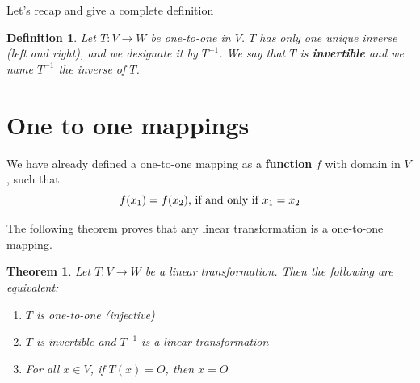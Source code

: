 \documentclass{book}
\newtheorem{theorem}{Theorem}[section]
\newtheorem{definition}{Definition}[section]
\begin{document}
Let's recap and give a complete definition

\begin{definition}
    Let $T:V \to W$ be one-to-one in $V$. $T$ has only one unique inverse (left and right), and
    we designate it by $T^{-1}$. We say that $T$ is \textbf{invertible} and we name $T^{-1}$ the
    inverse of $T$.
\end{definition}

\section{One to one mappings}

We have already defined a one-to-one mapping as a \textbf{function} $f$ with
domain in $V$, such that
\begin{equation*}
    f(x_1) = f(x_2), \, \textnormal{if and only if } x_1 = x_2
\end{equation*}

The following theorem proves that any linear transformation is a one-to-one
mapping.
\begin{theorem}
    Let $T: V \to W$ be a linear transformation. Then the following are equivalent:
    \begin{enumerate}
        \item $T$ is one-to-one (injective)
        \item $T$ is invertible and $T^{-1}$ is a linear transformation
        \item For all $x \in V$, if $T(x) = O$, then $x = O$
    \end{enumerate}
\end{theorem}

\end{document}
